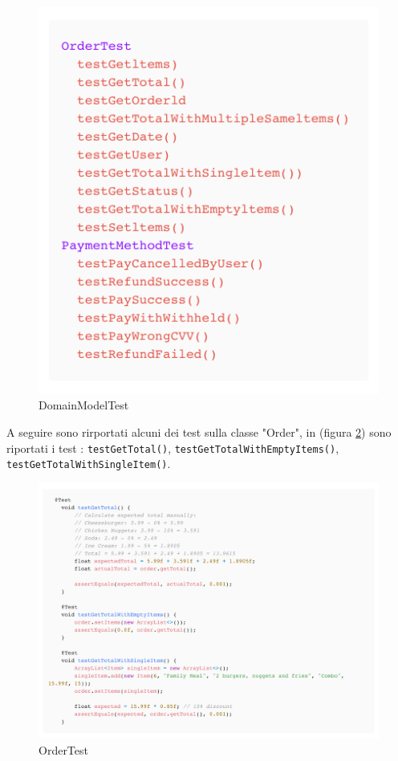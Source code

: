 \documentclass{article}
\begin{document}
\begin{figure}[!h]
    \centering
    \includegraphics[width=0.3\linewidth]{imgs/snippets/DomainModelTest.png}
    \caption{DomainModelTest}
    \label{DomainModelTest}
\end{figure}

A seguire sono rirportati alcuni dei test sulla classe "Order", in (figura \ref{OrderTest}) sono riportati i test : \texttt{testGetTotal()}, \texttt{testGetTotalWithEmptyItems()}, \texttt{testGetTotalWithSingleItem()}.

\begin{figure}[!h]
    \centering
    \includegraphics[width=1.0\linewidth]{imgs/snippets/OrderTest.png}
    \caption{OrderTest}
    \label{OrderTest}
\end{figure}
\end{document}
